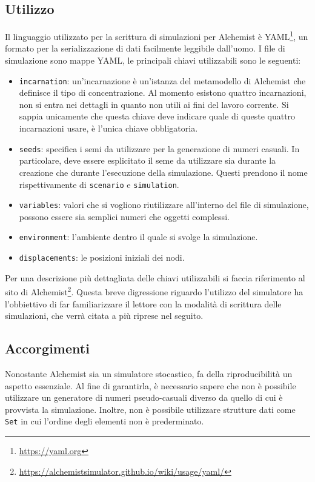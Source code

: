 \documentclass[12pt,a4paper,openright,oneside]{book}
\begin{document}
\subsection{Utilizzo}
Il linguaggio utilizzato per la scrittura di simulazioni per Alchemist è YAML\footnote{\url{https://yaml.org}}, un formato per la serializzazione di dati facilmente leggibile dall'uomo. I file di simulazione sono mappe YAML, le principali chiavi utilizzabili sono le seguenti:
\begin{itemize}
    \item \texttt{incarnation}: un'incarnazione è un'istanza del metamodello di Alchemist che definisce il tipo di concentrazione. Al momento esistono quattro incarnazioni, non si entra nei dettagli in quanto non utili ai fini del lavoro corrente. Si sappia unicamente che questa chiave deve indicare quale di queste quattro incarnazioni usare, è l'unica chiave obbligatoria.
    \item \texttt{seeds}: specifica i semi da utilizzare per la generazione di numeri casuali. In particolare, deve essere esplicitato il seme da utilizzare sia durante la creazione che durante l'esecuzione della simulazione. Questi prendono il nome rispettivamente di \texttt{scenario} e \texttt{simulation}.
    \item \texttt{variables}: valori che si vogliono riutilizzare all’interno del file di simulazione, possono essere sia semplici numeri che oggetti complessi.
    \item \texttt{environment}: l'ambiente dentro il quale si svolge la simulazione.
    \item \texttt{displacements}: le posizioni iniziali dei nodi.
\end{itemize}
Per una descrizione più dettagliata delle chiavi utilizzabili si faccia riferimento al sito di Alchemist\footnote{\url{https://alchemistsimulator.github.io/wiki/usage/yaml/}}. Questa breve digressione riguardo l'utilizzo del simulatore ha l'obbiettivo di far familiarizzare il lettore con la modalità di scrittura delle simulazioni, che verrà citata a più riprese nel seguito.

\subsection{Accorgimenti}
Nonostante Alchemist sia un simulatore stocastico, fa della riproducibilità un aspetto essenziale. Al fine di garantirla, è necessario sapere che non è possibile utilizzare un generatore di numeri pseudo-casuali diverso da quello di cui è provvista la simulazione. Inoltre, non è possibile utilizzare strutture dati come \texttt{Set} in cui l'ordine degli elementi non è prederminato. 
\end{document}
